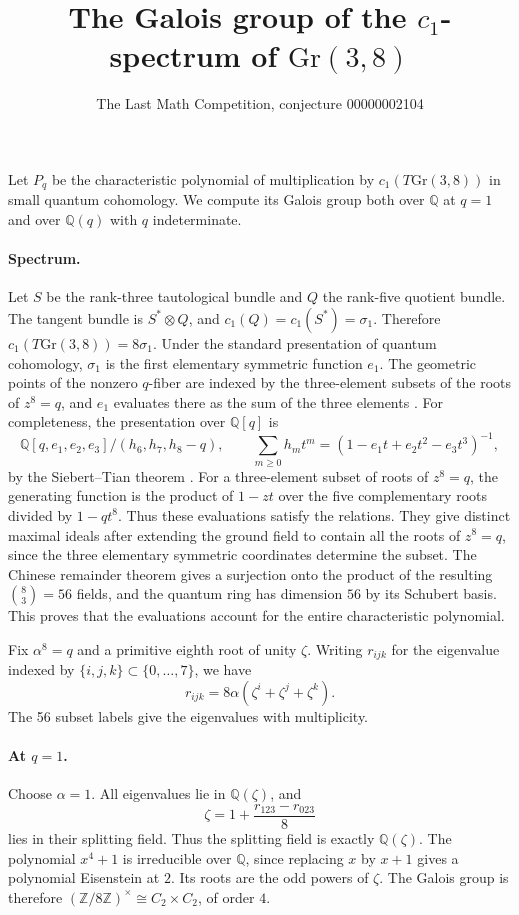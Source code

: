 \documentclass[11pt]{article}
\title{The Galois group of the \(c_1\)-spectrum of \(\mathrm{Gr}(3,8)\)}
\author{The Last Math Competition, conjecture 00000002104}
\date{}
\begin{document}
\maketitle

Let \(P_q\) be the characteristic polynomial of multiplication by
\(c_1(T\mathrm{Gr}(3,8))\) in small quantum cohomology.
We compute its Galois group both over \(\mathbb Q\) at \(q=1\)
and over \(\mathbb Q(q)\) with \(q\) indeterminate.

\paragraph{Spectrum.}
Let \(S\) be the rank-three tautological bundle and \(Q\) the
rank-five quotient bundle. The tangent bundle is \(S^*\otimes Q\),
and \(c_1(Q)=c_1(S^*)=\sigma_1\). Therefore \(c_1(T\mathrm{Gr}(3,8))=8\sigma_1\).
Under the standard presentation of quantum cohomology, \(\sigma_1\)
is the first elementary symmetric function \(e_1\).
The geometric points of the nonzero \(q\)-fiber are indexed by the
three-element subsets of the roots of \(z^8=q\), and \(e_1\) evaluates
there as the sum of the three elements
\cite[Lemma 3.7 and Theorem 3.4]{rietsch}.
For completeness, the presentation over \(\mathbb Q[q]\) is
\[
 \mathbb Q[q,e_1,e_2,e_3]/(h_6,h_7,h_8-q),
 \qquad
 \sum_{m\geq0}h_m t^m=(1-e_1t+e_2t^2-e_3t^3)^{-1},
\]
by the Siebert--Tian theorem \cite[Theorem 1]{galkin}.
For a three-element subset of roots of \(z^8=q\), the generating
function is the product of \(1-zt\) over the five complementary
roots divided by \(1-qt^8\). Thus these evaluations satisfy the
relations. They give distinct maximal ideals after extending the
ground field to contain all the roots of \(z^8=q\), since the three
elementary symmetric coordinates determine the subset. The
Chinese remainder theorem gives a surjection onto the product of
the resulting \(\binom83=56\) fields, and the quantum ring has
dimension \(56\) by its Schubert basis. This proves that the
evaluations account for the entire characteristic polynomial.

Fix \(\alpha^8=q\) and a primitive eighth root of unity \(\zeta\).
Writing \(r_{ijk}\) for the eigenvalue indexed by
\(\{i,j,k\}\subset\{0,\ldots,7\}\), we have
\[
 r_{ijk}=8\alpha(\zeta^i+\zeta^j+\zeta^k).
\]
The 56 subset labels give the eigenvalues with multiplicity.

\paragraph{At \(q=1\).}
Choose \(\alpha=1\). All eigenvalues lie in \(\mathbb Q(\zeta)\), and
\[
 \zeta=1+\frac{r_{123}-r_{023}}{8}
\]
lies in their splitting field. Thus the splitting field is exactly
\(\mathbb Q(\zeta)\). The polynomial \(x^4+1\) is irreducible over
\(\mathbb Q\), since replacing \(x\) by \(x+1\) gives a polynomial
Eisenstein at \(2\). Its roots are the odd powers of \(\zeta\).
The Galois group is therefore
\((\mathbb Z/8\mathbb Z)^\times\cong C_2\times C_2\), of order \(4\).
\end{document}
